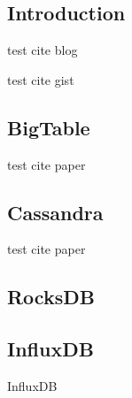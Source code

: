 \subsection{Introduction}

test cite blog\cite{blog:sstable-leveldb}

test cite gist\cite{blog:notes-for-reading-lsm-tree}

\subsection{BigTable}

test cite paper\cite{db:bigtable}

\subsection{Cassandra}

test cite paper\cite{db:cassandra}

\subsection{RocksDB}

\subsection{InfluxDB}

InfluxDB
